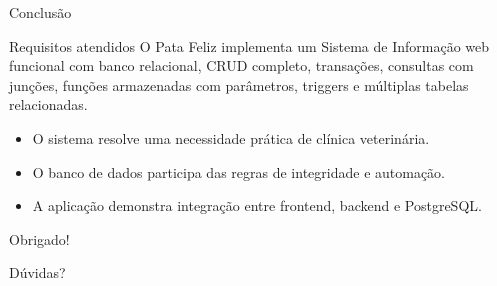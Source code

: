 \documentclass[aspectratio=169,11pt]{beamer}
\begin{document}
\begin{frame}{Conclusão}
  \begin{block}{Requisitos atendidos}
    O Pata Feliz implementa um Sistema de Informação web funcional com banco relacional, CRUD completo, transações, consultas com junções, funções armazenadas com parâmetros, triggers e múltiplas tabelas relacionadas.
  \end{block}

  \begin{itemize}
    \item O sistema resolve uma necessidade prática de clínica veterinária.
    \item O banco de dados participa das regras de integridade e automação.
    \item A aplicação demonstra integração entre frontend, backend e PostgreSQL.
  \end{itemize}
\end{frame}

\begin{frame}
  \centering
  {\Huge Obrigado!}

  \vspace{0.8cm}
  {\Large Dúvidas?}
\end{frame}
\end{document}
